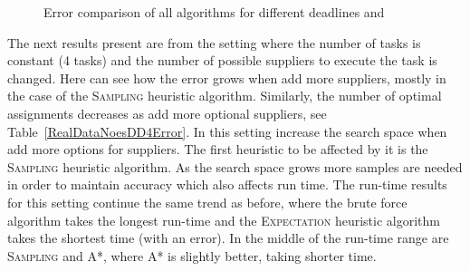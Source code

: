 \documentclass[letterpaper]{article} %
\newcommand{\astar}{\textsc{A*}\xspace}
\newcommand{\sampling}{\textsc{Sampling}\xspace}
\newcommand{\expectation}{\textsc{Expectation}\xspace}
\begin{document}

\begin{figure}[h!]
	\scriptsize
	\caption{Error comparison of all algorithms for different deadlines and }\label{allDDRealError}
\end{figure}

The next results  present are from the setting where the number of tasks is constant (4 tasks) and the number of possible suppliers to execute the task is changed. Here  can see how the error grows when  add more suppliers, mostly in the case of the \sampling heuristic algorithm. Similarly, the number of optimal assignments decreases as  add more optional suppliers, see Table~\ref{RealDataNoesDD4Error}. In this setting  increase the search space when  add more options for suppliers. The first heuristic to be affected by it is the \sampling heuristic algorithm. As the search space grows more samples are needed in order to maintain accuracy which also affects run time.
The run-time results %
for this setting continue the same trend as before, where the brute force algorithm takes the longest run-time and the \expectation heuristic algorithm takes the shortest time (with an error). In the middle of the run-time range are \sampling and \astar, where \astar is slightly better, taking shorter time.
\end{document}

